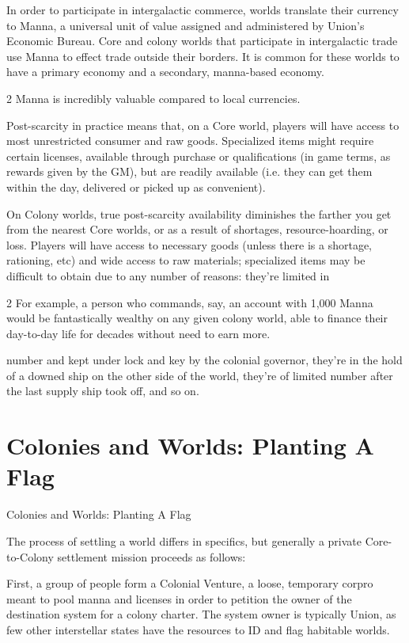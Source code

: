 In order to participate in intergalactic commerce, worlds translate their currency to Manna, a
universal unit of value assigned and administered by Union’s Economic Bureau. Core and colony
worlds that participate in intergalactic trade use Manna to effect trade outside their borders. It is
common for these worlds to have a primary economy and a secondary, manna-based economy.

                                                                       2
Manna is incredibly valuable compared to local currencies.


Post-scarcity in practice means that, on a Core world, players will have access to most
unrestricted consumer and raw goods. Specialized items might require certain licenses, available
through purchase or qualifications (in game terms, as rewards given by the GM), but are readily
available (i.e. they can get them within the day, delivered or picked up as convenient).


On Colony worlds, true post-scarcity availability diminishes the farther you get from the nearest
Core worlds, or as a result of shortages, resource-hoarding, or loss. Players will have access to
necessary goods (unless there is a shortage, rationing, etc) and wide access to raw materials;
specialized items may be difficult to obtain due to any number of reasons: they’re limited in

2 For example, a person who commands, say, an account with 1,000 Manna would be fantastically wealthy
on any given colony world, able to finance their day-to-day life for decades without need to earn more.




number and kept under lock and key by the colonial governor, they’re in the hold of a downed
ship on the other side of the world, they’re of limited number after the last supply ship took off,
and so on.

\section{Colonies and Worlds: Planting A Flag}
Colonies and Worlds: Planting A Flag

The process of settling a world differs in specifics, but generally a private Core-to-Colony
settlement mission proceeds as follows:


First, a group of people form a Colonial Venture, a loose, temporary corpro meant to pool manna
and licenses in order to petition the owner of the destination system for a colony charter. The
system owner is typically Union, as few other interstellar states have the resources to ID and flag
habitable worlds.


